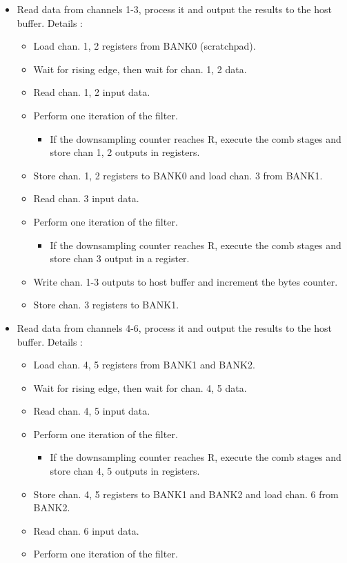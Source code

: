 \documentclass[]{report}
\providecommand{\tightlist}{%
	\setlength{\itemsep}{0pt}\setlength{\parskip}{0pt}}
\begin{document}
\begin{itemize}
\tightlist
\item
  Read data from channels 1-3, process it and output the results to the
  host buffer. Details :

  \begin{itemize}
  \tightlist
  \item
    Load chan. 1, 2 registers from BANK0 (scratchpad).
  \item
    Wait for rising edge, then wait for chan. 1, 2 data.
  \item
    Read chan. 1, 2 input data.
  \item
    Perform one iteration of the filter.

    \begin{itemize}
    \tightlist
    \item
      If the downsampling counter reaches R, execute the comb stages and
      store chan 1, 2 outputs in registers.
    \end{itemize}
  \item
    Store chan. 1, 2 registers to BANK0 and load chan. 3 from BANK1.
  \item
    Read chan. 3 input data.
  \item
    Perform one iteration of the filter.

    \begin{itemize}
    \tightlist
    \item
      If the downsampling counter reaches R, execute the comb stages and
      store chan 3 output in a register.
    \end{itemize}
  \item
    Write chan. 1-3 outputs to host buffer and increment the bytes counter.
  \item
    Store chan. 3 registers to BANK1.
  \end{itemize}
\item
   Read data from channels 4-6, process it and output the results to the
   host buffer. Details :

  \begin{itemize}
  \tightlist
  \item
    Load chan. 4, 5 registers from BANK1 and BANK2.
  \item
    Wait for rising edge, then wait for chan. 4, 5 data.
  \item
    Read chan. 4, 5 input data.
  \item
    Perform one iteration of the filter.

    \begin{itemize}
    \tightlist
    \item
      If the downsampling counter reaches R, execute the comb stages and
      store chan 4, 5 outputs in registers.
    \end{itemize}
  \item
    Store chan. 4, 5 registers to BANK1 and BANK2 and load chan. 6 from
    BANK2.
  \item
    Read chan. 6 input data.
  \item
    Perform one iteration of the filter.


\end{itemize}
\end{itemize}
\end{document}
